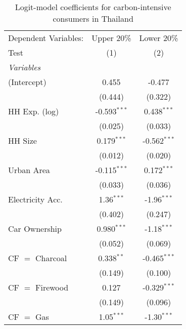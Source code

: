 
\begin{table}[htbp!]
   \centering
   \small
   \begin{adjustbox}{width = 1\textwidth, max height = 0.95\textheight, center}
      \begin{threeparttable}[b]
         \caption{\label{tab:Logit_1_THA} Logit-model coefficients for carbon-intensive consumers in Thailand}
         \begin{tabular}{lcc}
            \tabularnewline \midrule \midrule
            Dependent Variables:   & Upper 20\%     & Lower 20\%\\   
            Test                   & (1)            & (2)\\  
            \midrule
            \emph{Variables}\\
            (Intercept)            & 0.455          & -0.477\\   
                                   & (0.444)        & (0.322)\\   
            HH Exp. (log)          & -0.593$^{***}$ & 0.438$^{***}$\\   
                                   & (0.025)        & (0.033)\\   
            HH Size                & 0.179$^{***}$  & -0.562$^{***}$\\   
                                   & (0.012)        & (0.020)\\   
            Urban Area             & -0.115$^{***}$ & 0.172$^{***}$\\   
                                   & (0.033)        & (0.036)\\   
            Electricity Acc.       & 1.36$^{***}$   & -1.96$^{***}$\\   
                                   & (0.402)        & (0.247)\\   
            Car Ownership          & 0.980$^{***}$  & -1.18$^{***}$\\   
                                   & (0.052)        & (0.069)\\   
            CF $=$ Charcoal        & 0.338$^{**}$   & -0.465$^{***}$\\   
                                   & (0.149)        & (0.100)\\   
            CF $=$ Firewood        & 0.127          & -0.329$^{***}$\\   
                                   & (0.149)        & (0.096)\\   
            CF $=$ Gas             & 1.05$^{***}$   & -1.30$^{***}$\\   

\end{tabular}
\end{threeparttable}
\end{adjustbox}
\end{table}
